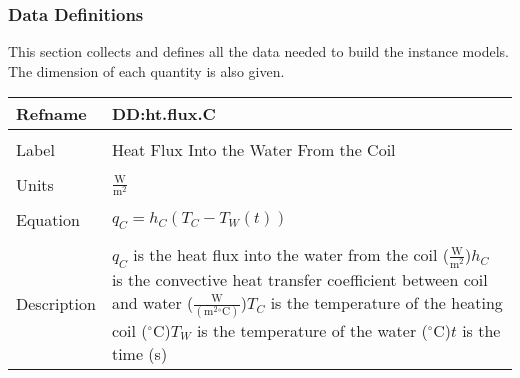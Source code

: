 \documentclass[12pt]{article}
\begin{document}
\subsubsection{Data Definitions}
\label{Sec:DDs}
This section collects and defines all the data needed to build the instance models. The dimension of each quantity is also given.
~\newline
\noindent \begin{minipage}{\textwidth}
\begin{tabular}{p{} p{}}
\toprule \textbf{Refname} & \textbf{DD:ht.flux.C}
\label{DD:ht.flux.C}
\\ \midrule \\
Label & Heat Flux Into the Water From the Coil
\\ \midrule \\
Units & $\frac{\text{W}}{\text{m}^{2}}$
\\ \midrule \\
Equation & ${q_{C}}={h_{C}} \left({T_{C}}-{T_{W}}\left(t\right)\right)$
\\ \midrule \\
Description & ${q_{C}}$ is the heat flux into the water from the coil ($\frac{\text{W}}{\text{m}^{2}}$)\newline${h_{C}}$ is the convective heat transfer coefficient between coil and water ($\frac{\text{W}}{(\text{m}^{2}{}^{\circ}\text{C})}$)\newline${T_{C}}$ is the temperature of the heating coil (${}^{\circ}$C)\newline${T_{W}}$ is the temperature of the water (${}^{\circ}$C)\newline$t$ is the time (s)
\\ \bottomrule \end{tabular}
\end{minipage}\\
~\newline
\end{document}
